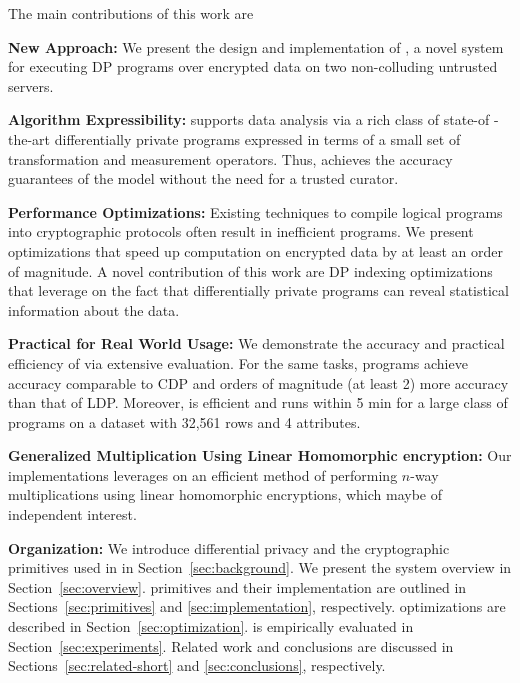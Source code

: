 The main contributions of this work are
\squishlist
\item \textbf{New Approach:} We present the design and implementation of \system, a novel system for executing DP programs over encrypted data on two non-colluding untrusted servers. %
\item \textbf{Algorithm Expressibility:} \system supports data analysis via a rich class of state-of -the-art differentially private programs expressed in terms of a small set of transformation and measurement operators. Thus, \system achieves the accuracy guarantees of the \cdp model without the need for a trusted curator.  
\item \textbf{Performance Optimizations:} Existing techniques to compile logical \system programs into cryptographic protocols often result in inefficient programs. We present optimizations that speed up computation on encrypted data by at least an order of magnitude. A novel contribution of this work are DP indexing optimizations that leverage on the fact that differentially private programs can reveal statistical information about the data. 
\item \textbf{Practical for Real World Usage:} We demonstrate the accuracy and practical efficiency of \system via extensive  evaluation. For the same tasks, \system programs achieve accuracy comparable to \textsf{CDP} and orders of magnitude (at least 2) more accuracy than that of \textsf{LDP}. Moreover, \system is efficient and runs within 5 min for a large class of programs on a dataset with 32,561 rows and 4 attributes.
\item \textbf{Generalized Multiplication Using Linear Homomorphic encryption:} Our implementations leverages on an efficient method of performing $n$-way multiplications using linear homomorphic encryptions, which maybe of independent interest.
\squishend


\noindent\textbf{Organization:} We introduce differential privacy and the cryptographic primitives used in \system in Section~\ref{sec:background}. We present the system overview in Section~\ref{sec:overview}. \system primitives and their implementation are outlined in Sections~\ref{sec:primitives} and \ref{sec:implementation}, respectively. \system optimizations  are described in Section~\ref{sec:optimization}. \system is empirically evaluated in Section~\ref{sec:experiments}. Related work and conclusions are discussed in Sections~\ref{sec:related-short} and \ref{sec:conclusions}, respectively.

